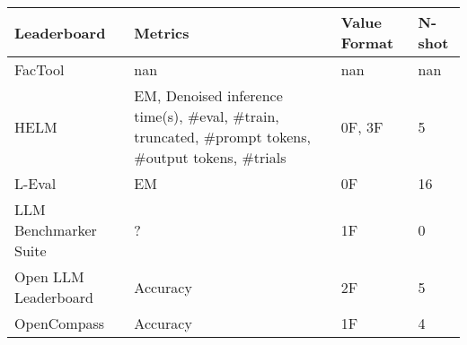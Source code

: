 \begin{tabular}{llll}
\toprule
Leaderboard & Metrics & Value Format & N-shot \\
\midrule
FacTool & nan & nan & nan \\
HELM & EM, Denoised inference time(s), \#eval, \#train, truncated, \#prompt tokens, \#output tokens, \#trials & 0F, 3F & 5 \\
L-Eval & EM & 0F & 16 \\
LLM Benchmarker Suite & ? & 1F & 0 \\
Open LLM Leaderboard & Accuracy & 2F & 5 \\
OpenCompass & Accuracy & 1F & 4 \\
\bottomrule
\end{tabular}
